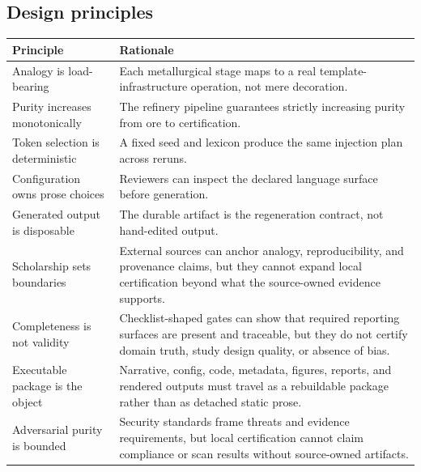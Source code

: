 \documentclass[
  english,
]{article}
\newcounter{none} %
\begin{document}
\subsection{Design principles}\label{design-principles}

{\def\LTcaptype{none} %
\begin{longtable}[]{@{}
  >{\raggedright\arraybackslash}p{}
  >{\raggedright\arraybackslash}p{}@{}}
\toprule\noalign{}
\begin{minipage}[b]{\linewidth}\raggedright
Principle
\end{minipage} & \begin{minipage}[b]{\linewidth}\raggedright
Rationale
\end{minipage} \\
\midrule\noalign{}
\endhead
\bottomrule\noalign{}
\endlastfoot
Analogy is load-bearing & Each metallurgical stage maps to a real
template-infrastructure operation, not mere decoration. \\
Purity increases monotonically & The refinery pipeline guarantees
strictly increasing purity from ore to certification. \\
Token selection is deterministic & A fixed seed and lexicon produce the
same injection plan across reruns. \\
Configuration owns prose choices & Reviewers can inspect the declared
language surface before generation. \\
Generated output is disposable & The durable artifact is the
regeneration contract, not hand-edited output. \\
Scholarship sets boundaries & External sources can anchor analogy,
reproducibility, and provenance claims, but they cannot expand local
certification beyond what the source-owned evidence supports. \\
Completeness is not validity & Checklist-shaped gates can show that
required reporting surfaces are present and traceable, but they do not
certify domain truth, study design quality, or absence of bias. \\
Executable package is the object & Narrative, config, code, metadata,
figures, reports, and rendered outputs must travel as a rebuildable
package rather than as detached static prose. \\
Adversarial purity is bounded & Security standards frame threats and
evidence requirements, but local certification cannot claim compliance
or scan results without source-owned artifacts. \\
\end{longtable}
}
\end{document}
